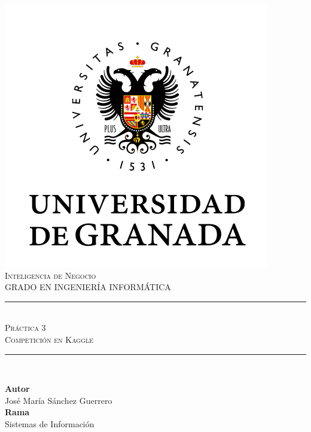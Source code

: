 \documentclass[11pt,a4paper]{article}
\newcommand{\asignatura}{Inteligencia de Negocio}
\newcommand{\autor}{José María Sánchez Guerrero}
\newcommand{\titulo}{Práctica 3}
\newcommand{\subtitulo}{Competición en Kaggle}
\begin{document}

\begin{titlepage}

\begin{minipage}{\textwidth}

\centering

\includegraphics[scale=0.5]{img/ugr.png}\\

\textsc{\Large \asignatura{}\\[0.2cm]}
\textsc{GRADO EN INGENIERÍA INFORMÁTICA}\\[1cm]

\noindent\rule[-1ex]{\textwidth}{1pt}\\[1.5ex]
\textsc{{\Huge \titulo\\[0.5ex]}}
\textsc{{\Large \subtitulo\\}}
\noindent\rule[-1ex]{\textwidth}{2pt}\\[3.5ex]

\end{minipage}

\vspace{0.5cm}

\begin{minipage}{\textwidth}

\centering

\textbf{Autor}\\ {\autor{}}\\[2.5ex]
\textbf{Rama}\\ {Sistemas de Información}\\[2.5ex]
\vspace{0.3cm}


\end{minipage}
\end{titlepage}
\end{document}
